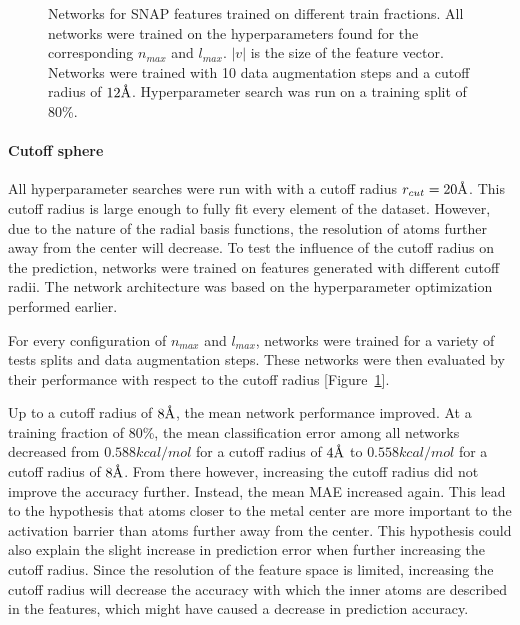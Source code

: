 \begin{figure}[H]
  \endminipage
  \caption[Learning curves for different SNAP resolutions]{
  Networks for SNAP features trained on different train fractions.
  All networks were trained on the hyperparameters found for the corresponding $n_{max}$ and $l_{max}$.
  $|v|$ is the size of the feature vector.
  Networks were trained with 10 data augmentation steps and a cutoff radius of $12 \AA$.
  Hyperparameter search was run on a training split of 80\%.
  }
  \label{fig:snap_hyperparameter}
\end{figure}

\paragraph{Cutoff sphere}
All hyperparameter searches were run with with a cutoff radius $r_{cut} = 20 \AA$.
This cutoff radius is large enough to fully fit every element of the dataset.
However, due to the nature of the radial basis functions, the resolution of atoms 
further away from the center will decrease.
To test the influence of the cutoff radius on the prediction, 
networks were trained on features generated with different cutoff radii.
The network architecture was based on the hyperparameter optimization performed earlier.

For every configuration of $n_{max}$ and $l_{max}$, networks were trained for a variety 
of tests splits and data augmentation steps.
These networks were then evaluated by their performance with respect to the cutoff radius [Figure~\ref{fig:snap_hyperparameter}].

Up to a cutoff radius of $8 \AA$, the mean network performance improved. 
At a training fraction of 80\%, the mean classification error among 
all networks decreased from $0.588 kcal/mol$ for a cutoff radius of $4 \AA$ to 
$0.558 kcal/mol$ for a cutoff radius of $8 \AA$.
From there however, increasing the cutoff radius did not improve the accuracy further.
Instead, the mean MAE increased again.
This lead to the hypothesis that atoms closer to the metal center are more important to the activation barrier than atoms further away from the center.
This hypothesis could also explain the slight increase in prediction error when further increasing the cutoff radius.
Since the resolution of the feature space is limited, increasing the cutoff radius will decrease the accuracy 
with which the inner atoms are described in the features, which might have caused a decrease in prediction accuracy.

